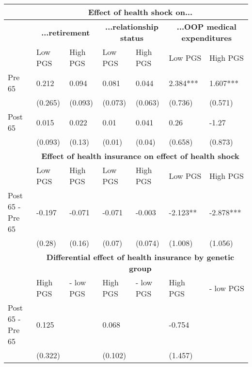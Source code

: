 % 
\begin{tabular}{l| p{2.5cm}p{2.5cm}| p{2.5cm}p{2.5cm}| p{2.5cm}p{2.5cm}}
  & \multicolumn{6}{c}{\textbf{Effect of health shock on...}} \\
 \toprule
  & \multicolumn{2}{c}{ \textbf{...retirement}} &  \multicolumn{2}{c}{ \textbf{...relationship status}} &  \multicolumn{2}{c}{ \textbf{...OOP medical expenditures}}  \\
 \midrule
 & Low PGS & High PGS & Low PGS & High PGS & Low PGS & High PGS \\ 
   \midrule
Pre 65 & 0.212 & 0.094 & 0.081 & 0.044 & 2.384*** & 1.607*** \\ 
   & (0.265) & (0.093) & (0.073) & (0.063) & (0.736) & (0.571) \\ 
  Post 65 & 0.015 & 0.022 & 0.01 & 0.041 & 0.26 & -1.27 \\ 
   & (0.093) & (0.13) & (0.01) & (0.04) & (0.658) & (0.873) \\ 
   \toprule & \multicolumn{6}{c}{ \textbf{Effect of health insurance on effect of health shock}} \\
 \midrule
 & Low PGS & High PGS & Low PGS & High PGS & Low PGS & High PGS \\ 
   \midrule
Post 65 - Pre 65 & -0.197 & -0.071 & -0.071 & -0.003 & -2.123** & -2.878*** \\ 
   & (0.28) & (0.16) & (0.07) & (0.074) & (1.008) & (1.056) \\ 
   \toprule & \multicolumn{6}{c}{ \textbf{Differential effect of health insurance by genetic group}} \\
 \midrule
 & High PGS  & - low PGS & High PGS  & - low PGS & High PGS  & - low PGS \\ 
   \midrule
Post 65 - Pre 65 & 0.125 &  & 0.068 &  & -0.754 &  \\ 
   & (0.322) &  & (0.102) &  & (1.457) &  \\ 
  \end{tabular}

